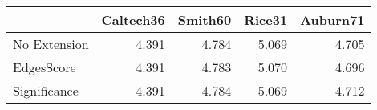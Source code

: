 \begin{tabular}{lrrrr}
\toprule
{} & Caltech36 & Smith60 & Rice31 & Auburn71 \\
\midrule
No Extension &     4.391 &   4.784 &  5.069 &    4.705 \\
EdgesScore   &     4.391 &   4.783 &  5.070 &    4.696 \\
Significance &     4.391 &   4.784 &  5.069 &    4.712 \\
\bottomrule
\end{tabular}
